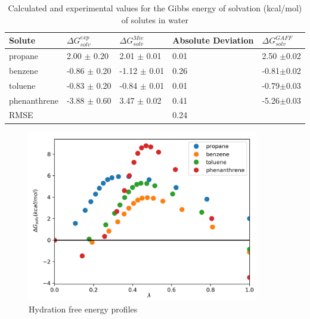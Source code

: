 \begin{table}[!htb]
  \centering
  \caption{Calculated and experimental values for the Gibbs energy of solvation (kcal/mol) of solutes in water}
  \label{tbl:solv2}
  \begin{tabular}{lllll}
    \hline
     Solute      & $\Delta G_{solv}^{exp}$ & $\Delta G_{solv}^{Mie}$ & Absolute Deviation &$\Delta G_{solv}^{GAFF}$ \\
    \hline
    propane      &  2.00 $\pm$ 0.20 & 2.01 $\pm$ 0.01& 0.01 &2.50 $\pm$0.02 \\
    benzene      & -0.86 $\pm$ 0.20 & -1.12 $\pm$ 0.01    &  0.26    &-0.81$\pm$0.02 \\  
    toluene      & -0.83 $\pm$ 0.20 & -0.84 $\pm$ 0.01   &  0.01    &-0.79$\pm$0.03\\
    phenanthrene & -3.88 $\pm$ 0.60 & 3.47 $\pm$ 0.02& 0.41 &-5.26$\pm$0.03 \\
    \hline
    RMSE         &                  &               &  0.24     &      \\
    \hline
  \end{tabular}

\end{table}


\begin{figure}
\centering
\includegraphics[width=0.9\textwidth]{Figures/water}
\caption{Hydration free energy profiles}
\label{fig:water}
\end{figure}

